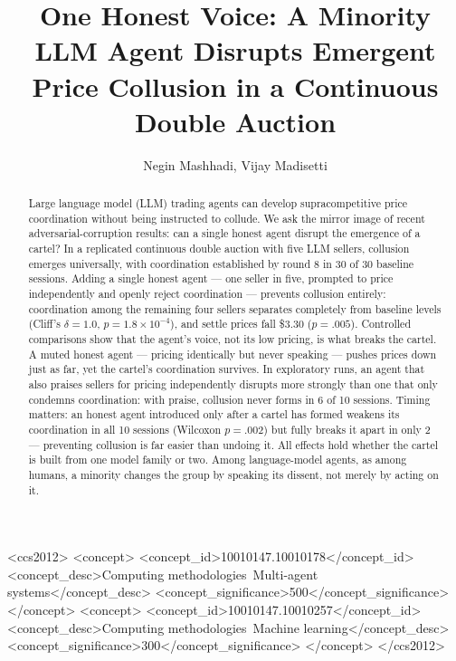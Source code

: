 \documentclass[acmsmall]{acmart}
\begin{document}
\title{One Honest Voice: A Minority LLM Agent Disrupts Emergent Price Collusion in a Continuous Double Auction}

\author{Negin Mashhadi, Vijay Madisetti}

\begin{abstract}
Large language model (LLM) trading agents can develop supracompetitive price
coordination without being instructed to collude. We ask the mirror image of
recent adversarial-corruption results: can a single honest agent disrupt the
emergence of a cartel? In a replicated continuous double auction with five LLM
sellers, collusion emerges universally, with coordination established by round
8 in 30 of 30 baseline sessions. Adding a single honest agent --- one seller
in five, prompted to price independently and openly reject coordination ---
prevents collusion entirely: coordination among the remaining four sellers
separates completely from baseline levels (Cliff's $\delta = 1.0$,
$p = 1.8 \times 10^{-4}$), and settle prices fall \$3.30 ($p = .005$).
Controlled comparisons show that the agent's voice, not its low pricing, is
what breaks the cartel. A muted honest agent --- pricing identically but never
speaking --- pushes prices down just as far, yet the cartel's coordination
survives. In exploratory runs, an agent that also praises sellers for pricing
independently disrupts more strongly than one that only condemns coordination:
with praise, collusion never forms in 6 of 10 sessions. Timing matters: an
honest agent introduced only after a cartel has formed weakens its
coordination in all 10 sessions (Wilcoxon $p = .002$) but fully breaks it
apart in only 2 --- preventing collusion is far easier than undoing it. All
effects hold whether the cartel is built from one model family or two. Among
language-model agents, as among humans, a minority changes the group by
speaking its dissent, not merely by acting on it.
\end{abstract}

\begin{CCSXML}
<ccs2012>
<concept>
<concept_id>10010147.10010178</concept_id>
<concept_desc>Computing methodologies~Multi-agent systems</concept_desc>
<concept_significance>500</concept_significance>
</concept>
<concept>
<concept_id>10010147.10010257</concept_id>
<concept_desc>Computing methodologies~Machine learning</concept_desc>
<concept_significance>300</concept_significance>
</concept>
</ccs2012>
\end{CCSXML}
\end{document}
